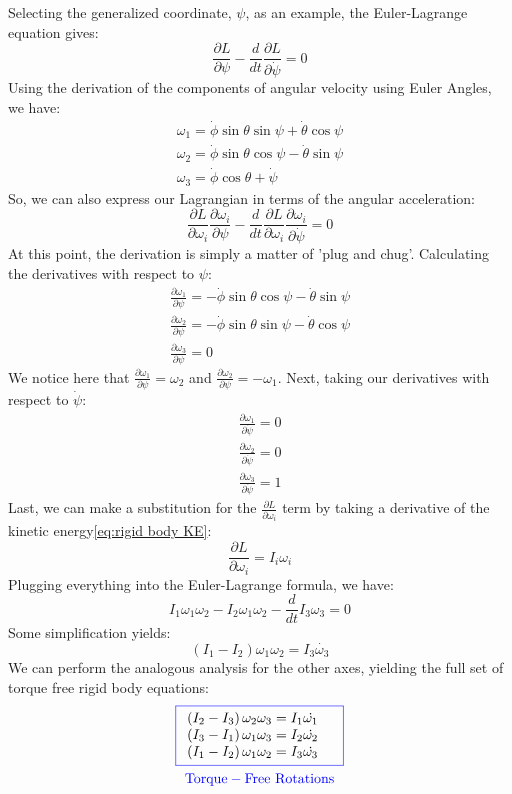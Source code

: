 \documentclass[12pt]{report}
\begin{document}
Selecting the generalized coordinate, $\psi$, as an example, the Euler-Lagrange equation gives:
$$\frac{\partial L}{\partial \psi}-\frac{d}{dt}\frac{\partial L}{\partial \dot{\psi}}=0$$
Using the derivation of the components of angular velocity using Euler Angles, we have:
\begin{gather}
\omega_1=\dot{\phi}\sin\theta\sin\psi+\dot{\theta}\cos\psi\\
    \omega_2=\dot{\phi}\sin\theta\cos\psi-\dot{\theta}\sin\psi\\
    \omega_3=\dot{\phi}\cos\theta+\dot{\psi}
\end{gather}
So, we can also express our \gls{Lagrangian} in terms of the angular acceleration:
$$\frac{\partial L}{\partial \omega_i}\frac{\partial \omega_i}{\partial \psi}-\frac{d}{dt}\frac{\partial L}{\partial \omega_i}\frac{\partial \omega_i}{\partial \dot{\psi}}=0$$
At this point, the derivation is simply a matter of 'plug and chug'. Calculating the derivatives with respect to $\psi$:
\begin{gather}
    \frac{\partial \omega_1}{\partial \psi}=-\dot{\phi}\sin\theta\cos\psi-\dot{\theta}\sin\psi\\
    \frac{\partial \omega_2}{\partial \psi}=-\dot{\phi}\sin\theta\sin\psi-\dot{\theta}\cos\psi\\
    \frac{\partial \omega_3}{\partial \psi}=0
\end{gather}
We notice here that $\frac{\partial \omega_1}{\partial \psi}=\omega_2$ and $\frac{\partial \omega_2}{\partial \psi}=-\omega_1$. Next, taking our derivatives with respect to $\dot{\psi}$:
\begin{gather}
    \frac{\partial \omega_1}{\partial \dot{\psi}}=0\\
    \frac{\partial \omega_2}{\partial \dot{\psi}}=0\\
    \frac{\partial \omega_3}{\partial \dot{\psi}}=1
\end{gather}
Last, we can make a substitution for the $\frac{\partial L}{\partial \omega_i}$ term by taking a derivative of the kinetic energy\eqref{eq:rigid body KE}:
$$\frac{\partial L}{\partial \omega_i}=I_i\omega_i$$
Plugging everything into the Euler-Lagrange formula, we have:
$$I_1\omega_1\omega_2-I_2\omega_1\omega_2-\frac{d}{dt}I_3\omega_3=0$$
Some simplification yields:
$$\left(I_1-I_2\right)\omega_1\omega_2=I_3\dot{\omega_3}$$
We can perform the analogous analysis for the other axes, yielding the full set of torque free rigid body equations:
\begin{gather}
\color{blue}\boxed{
\begin{array}{ll}
\color{black}
\left(I_2-I_3\right)\omega_2\omega_3=I_1\dot{\omega_1}
     &\\
     \color{black}\left(I_3-I_1\right)\omega_1\omega_3=I_2\dot{\omega_2}
     &\\
     \color{black}\left(I_1-I_2\right)\omega_1\omega_2=I_3\dot{\omega_3}
\end{array}}\\
\color{blue}
\mathrm{Torque-Free \ Rotations}
\end{gather}
\end{document}
